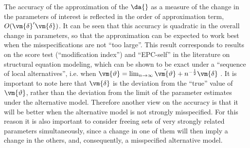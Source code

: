 The accuracy of the approximation of the $\da{}$ as a measure of the change in the parameters of interest is reflected in the order of approximation term, $O(\vm{\delta}^\prime\vm{\delta})$. It can be seen that this accuracy is quadratic in the overall change in parameters, so that the approximation can be expected to work best when the misspecifications are not ``too large''. This result corresponds to results on the score test (``modification index'') and ``EPC-self'' in the literature on structural equation modeling, which can be shown to be exact under a ``sequence of local alternatives'', i.e. when $\vm{\vartheta} = \lim_{n\rightarrow\infty} \hat{\vm{\vartheta}} + n^{-\frac{1}{2}}\vm{\delta}$ \citep[p. 135]{satorra1989alternative}.
It is important to note here that $\vm{\delta}$ is the deviation from the ``true'' value of $\vm{\vartheta}$, rather than the deviation from the limit of the parameter estimates under the alternative model. Therefore another view on the accuracy is that it will be better when the alternative model is not strongly misspecified. For this reason it is also important to consider freeing sets of very strongly related parameters simultaneously, since a change in one of them will then imply a change in the others, and, consequently, a misspecified alternative model.

